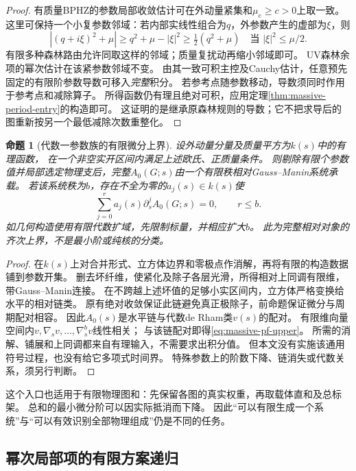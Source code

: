 \documentclass[11pt,a4paper]{ctexart}
\theoremstyle{cnplain}\newtheorem{theorem}{定理}[section]
\newtheorem{proposition}[theorem]{命题}
\theoremstyle{definition}\newtheorem{definition}[theorem]{定义}
\theoremstyle{remark}\newtheorem{remark}[theorem]{注}
\begin{document}
\begin{proof}
有质量BPHZ的参数局部收敛估计可在外动量紧集和$\mu_e\geq c>0$上取一致。
这里可保持一个小复参数邻域：若内部实线性组合为$q$，外参数产生的虚部为$\xi$，则
\[
 \left|(q+i\xi)^2+\mu\right|
 \geq q^2+\mu-|\xi|^2\geq\tfrac12(q^2+\mu)
 \quad\text{当 }|\xi|^2\leq\mu/2.
\]
有限多种森林路由允许同取这样的邻域；质量复扰动再缩小邻域即可。
UV森林余项的幂次估计在该紧参数邻域不变。
由其一致可积主控及Cauchy估计，任意预先固定的有限阶参数导数可移入\emph{完整}积分。
若参考点随参数移动，导数须同时作用于参考点和减除算子。
所得函数仍有理且绝对可积，应用定理\ref{thm:massive-period-entry}的构造即可。
这证明的是继承原森林规则的导数；它不把求导后的图重新按另一个最低减除次数重整化。
\end{proof}

\begin{proposition}[代数一参数族的有限微分上界]
\label{prop:massive-pf}
设外动量分量及质量平方为$k(s)$中的有理函数，
在一个非空实开区间内满足上述欧氏、正质量条件。
则剔除有限个参数值并局部选定物理支后，完整$A_0(G;s)$由一个有限秩相对Gauss--Manin系统承载。
若该系统秩为$b$，存在不全为零的$a_j(s)\in k(s)$使
\begin{equation}
 \sum_{j=0}^{r}a_j(s)\partial_s^j A_0(G;s)=0,
 \qquad r\leq b.
 \label{eq:massive-pf-upper}
\end{equation}
如几何构造使用有限代数扩域，先限制标量，并相应扩大$b$。
此为完整相对对象的齐次上界，不是最小阶或纯核的分类。
\end{proposition}

\begin{proof}
在$k(s)$上对合并形式、立方体边界和零极点作消解，再将有限的构造数据铺到参数开集。
删去坏纤维，使紧化及除子各层光滑，所得相对上同调有限维，带Gauss--Manin连接。
在不跨越上述坏值的足够小实区间内，立方体严格变换给水平的相对链类。
原有绝对收敛保证此链避免真正极除子，前命题保证微分与周期配对相容。
因此$A_0(s)$是水平链与代数de Rham类$v(s)$的配对。
有限维向量空间内$v,\nabla_s v,\ldots,\nabla_s^b v$线性相关；
与该链配对即得\eqref{eq:massive-pf-upper}。
所需的消解、铺展和上同调都来自有理输入，不需要求出积分值。
但本文没有实施该通用符号过程，也没有给它多项式时间界。
特殊参数上的阶数下降、链消失或代数关系，须另行判断。
\end{proof}

这个入口也适用于有限物理图和：先保留各图的真实权重，再取载体直和及总标架。
总和的最小微分阶可以因实际抵消而下降。
因此“可以有限生成一个系统”与“可以有效识别全部物理组成”仍是不同的任务。

\subsection{幂次局部项的有限方案递归}
\end{document}
